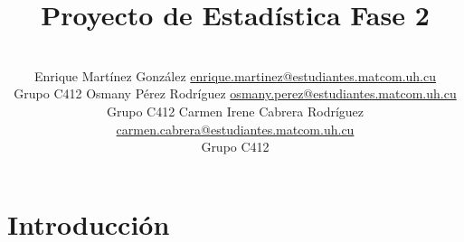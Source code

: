 \documentclass[a4paper,10pt,twocolumn]{article}
\title{Proyecto de Estadística Fase 2}
\author{\\
\name Enrique Martínez González \email \href{mailto:enrique.martinez@estudiantes.matcom.uh.cu}{enrique.martinez@estudiantes.matcom.uh.cu}
	\\ \addr Grupo C412 \AND
\name Osmany Pérez Rodríguez \email \href{mailto:osmany.perez@estudiantes.matcom.uh.cu}{osmany.perez@estudiantes.matcom.uh.cu}
  \\ \addr Grupo C412 \AND
\name Carmen Irene Cabrera Rodríguez \email \href{mailto:carmen.cabrera@estudiantes.matcom.uh.cu}{carmen.cabrera@estudiantes.matcom.uh.cu}
\\ \addr Grupo C412}
\begin{document}



\section{Introducción}\label{sec:intro}
\end{document}
